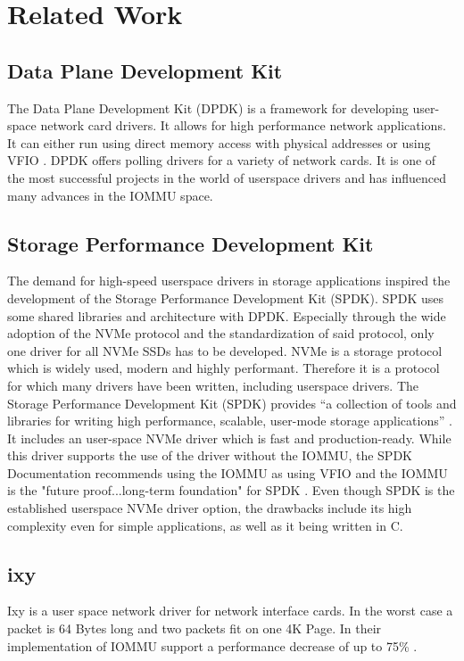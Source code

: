 \chapter{Related Work}

\section{Data Plane Development Kit}
The Data Plane Development Kit (DPDK) is a framework for developing user-space network card drivers. It allows for high performance network applications. It can either run using direct memory access with physical addresses or using VFIO \cite{aboutdpdk}. DPDK offers polling drivers for a variety of network cards.
It is one of the most successful projects in the world of userspace drivers and has influenced many advances in the IOMMU space.

\section{Storage Performance Development Kit}
The demand for high-speed userspace drivers in storage applications inspired the development of the Storage Performance Development Kit (SPDK). SPDK uses some shared libraries and architecture with DPDK. Especially through the wide adoption of the NVMe protocol and the standardization of said protocol, only one driver for all NVMe SSDs has to be developed.
NVMe is a storage protocol which is widely used, modern and highly performant. Therefore it is a protocol for which many drivers have been written, including userspace drivers. The Storage Performance Development Kit (SPDK) provides ``a collection of tools and libraries for writing high performance, scalable, user-mode storage applications'' \cite{spdkindex}. It includes an user-space NVMe driver which is fast and production-ready. While this driver supports the use of the driver without the IOMMU, the SPDK Documentation recommends using the IOMMU as using VFIO and the IOMMU is the "future proof...long-term foundation" for SPDK \cite{spdkmemory}. Even though SPDK is the established userspace NVMe driver option, the drawbacks include its high complexity even for simple applications, as well as it being written in C.

\section{ixy} \label{s:ixy}
Ixy is a user space network driver for network interface cards. In the worst case a packet is 64 Bytes long and two packets fit on one 4K Page. In their implementation of IOMMU support a performance decrease of up to 75\% \cite{iommuhuber}.

